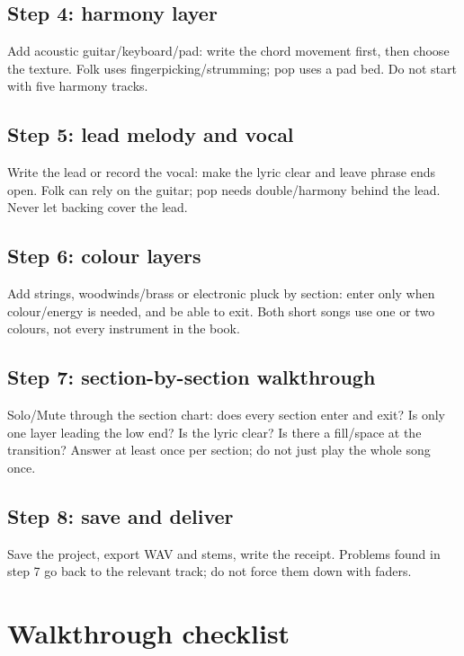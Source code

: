 \subsection*{Step 4: harmony layer}
Add acoustic guitar/keyboard/pad: write the chord movement first, then choose the texture. Folk uses fingerpicking/strumming; pop uses a pad bed. Do not start with five harmony tracks.

\subsection*{Step 5: lead melody and vocal}
Write the lead or record the vocal: make the lyric clear and leave phrase ends open. Folk can rely on the guitar; pop needs double/harmony behind the lead. Never let backing cover the lead.

\subsection*{Step 6: colour layers}
Add strings, woodwinds/brass or electronic pluck by section: enter only when colour/energy is needed, and be able to exit. Both short songs use one or two colours, not every instrument in the book.

\subsection*{Step 7: section-by-section walkthrough}
Solo/Mute through the section chart: does every section enter and exit? Is only one layer leading the low end? Is the lyric clear? Is there a fill/space at the transition? Answer at least once per section; do not just play the whole song once.

\subsection*{Step 8: save and deliver}
Save the project, export WAV and stems, write the receipt. Problems found in step 7 go back to the relevant track; do not force them down with faders.

\section{Walkthrough checklist}
\label{sec:walkthrough-checklist}

